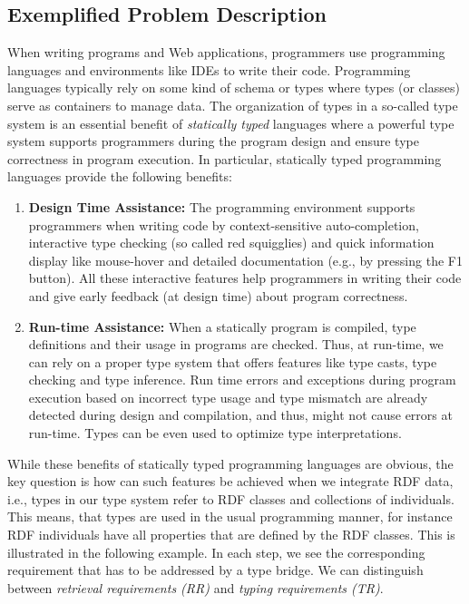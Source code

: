 \documentclass{llncs} %
\newcommand{\ggr}[1]{} %
\begin{document}
\subsection{Exemplified Problem Description}

When writing programs and Web applications, programmers use programming languages and environments like IDEs
to write their code. 
Programming languages typically rely on some kind of schema or types
where types (or classes) serve as containers to manage data.
The organization of types in a so-called type system is an essential benefit of \emph{statically typed} languages where a powerful type system supports programmers during the program design and 
ensure type correctness in program execution. In particular, statically typed programming languages provide the following benefits:


\begin{enumerate}
	\item \textbf{Design Time Assistance:} The programming environment  supports programmers when writing code by
	 context-sensitive auto-completion, interactive type checking (so called red squigglies) and quick information display like mouse-hover
	and detailed documentation (e.g., by pressing the F1 button). All these interactive features help programmers in writing their code
	and give early feedback (at design time) about program correctness. 
	\item \textbf{Run-time Assistance:} When a statically program is compiled, type definitions and their usage in programs
	        are checked. Thus, at run-time, we can rely on a proper type system that offers features like type casts,
					 type checking and type inference. Run time errors and exceptions during program execution based on
					 incorrect type usage and type mismatch are already detected during design and compilation, and thus, might not
					cause errors at run-time. Types can be even used to optimize type interpretations.
					\ggr{I can't remember what the last sentence about optimize / drive interpretations mean.}
					
\end{enumerate}

While these benefits of statically typed programming languages are obvious,
the key question is how can such features be achieved when we integrate RDF data,
i.e., types in our type system refer to RDF classes and collections of individuals.
This means, that types are used in the usual programming manner, for instance RDF individuals
have all properties that are defined by the RDF classes. This is illustrated in the following example.
In each step, we see the corresponding requirement that has to be addressed by a type bridge.
We can distinguish between \emph{retrieval requirements (RR)} and \emph{typing requirements (TR)}.
\end{document}
